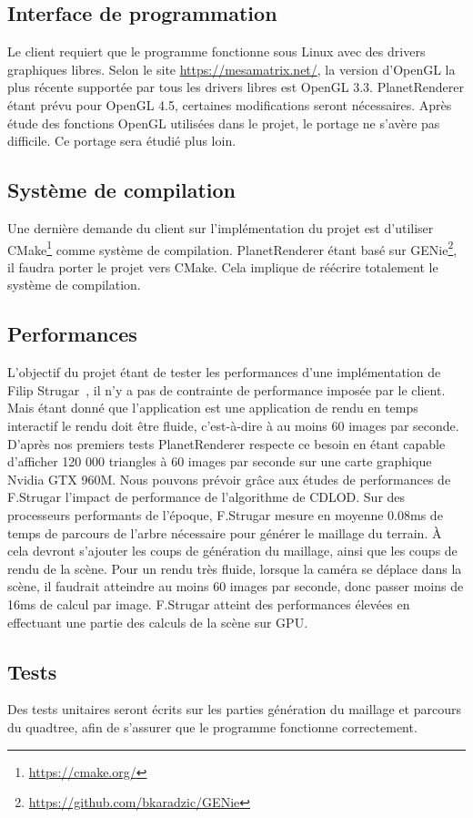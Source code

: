 \subsection{Interface de programmation}

Le client requiert que le programme fonctionne sous Linux avec des drivers graphiques libres.
Selon le site \url{https://mesamatrix.net/}, la version d'OpenGL la plus récente supportée
par tous les drivers libres est OpenGL 3.3.
PlanetRenderer étant prévu pour OpenGL 4.5, certaines modifications
seront nécessaires. Après étude des fonctions OpenGL utilisées dans le
projet, le portage ne s'avère pas difficile. Ce portage sera étudié plus
loin.

\subsection{Système de compilation}

Une dernière demande du client sur l'implémentation du projet est
d'utiliser CMake\footnote{\url{https://cmake.org/}} comme système de
compilation. PlanetRenderer étant basé sur GENie\footnote{\url{https://github.com/bkaradzic/GENie}},
il faudra porter le projet vers CMake. Cela implique de réécrire
totalement le système de compilation.

\subsection{Performances}

L’objectif du projet étant de tester les performances d’une implémentation
de Filip Strugar~\cite{CDLOD}, il n’y a pas de contrainte de performance imposée
par le client. Mais étant donné que l'application est une application de rendu en temps interactif le rendu
doit être fluide, c'est-à-dire à au moins 60 images par seconde. 
D'après nos premiers tests PlanetRenderer respecte ce besoin en étant capable
d'afficher 120 000 triangles à 60 images par seconde sur une carte
graphique Nvidia GTX 960M. Nous pouvons prévoir grâce aux études de performances de
F.Strugar l’impact de performance de l’algorithme de CDLOD. Sur
des processeurs performants de l’époque, F.Strugar mesure en moyenne
0.08ms de temps de parcours de l’arbre nécessaire pour générer le maillage
du terrain. À cela devront s’ajouter les coups de génération du maillage, ainsi
que les coups de rendu de la scène. Pour un rendu très fluide, lorsque la caméra
se déplace dans la scène, il faudrait atteindre au moins 60 images par
seconde, donc passer moins de 16ms de calcul par image. F.Strugar atteint
des performances élevées en effectuant une partie des calculs de la scène
sur GPU.



\subsection{Tests}

Des tests unitaires seront écrits sur les parties génération du maillage et parcours du quadtree, afin de s'assurer que le programme fonctionne correctement.